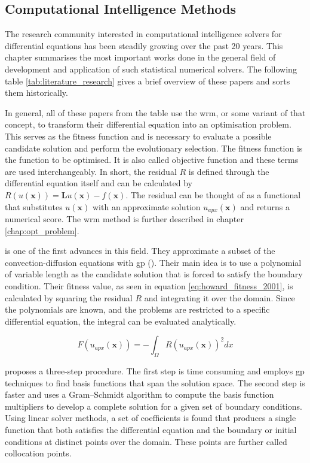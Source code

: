 \documentclass[./\jobname.tex]{subfiles}
\begin{document}
\subsection{Computational Intelligence Methods} 
\label{chap:literature_overview}

The research community interested in computational intelligence solvers for differential equations has been steadily growing over the past 20 years. This chapter summarises the most important works done in the general field of development and application of such statistical numerical solvers. The following table \ref{tab:literature_research} gives a brief overview of these papers and sorts them historically. 

In general, all of these papers from the table use the \gls{wrm}, or some variant of that concept, to transform their differential equation into an optimisation problem. This serves as the fitness function and is necessary to evaluate a possible candidate solution and perform the evolutionary selection. The fitness function is the function to be optimised. It is also called objective function and these terms are used interchangeably. In short, the residual $R$ is defined through the differential equation itself and can be calculated by $R(u(\mathbf{x})) = \mathbf{L}u(\mathbf{x}) - f(\mathbf{x})$. The residual can be thought of as a functional that substitutes $u(\mathbf{x})$ with an approximate solution $u_{apx}(\mathbf{x})$ and returns a numerical score. The \gls{wrm} method is further described in chapter \ref{chap:opt_problem}.

\cite{howard_genetic_2001} is one of the first advances in this field. They approximate a subset of the convection-diffusion equations with \gls{gp} (\cite{koza_genetic_1992}). Their main idea is to use a polynomial of variable length as the candidate solution that is forced to satisfy the boundary condition. Their fitness value, as seen in equation \eqref{eq:howard_fitness_2001}, is calculated by squaring the residual $R$ and integrating it over the domain. Since the polynomials are known, and the problems are restricted to a specific differential equation, the integral can be evaluated analytically. 

\begin{equation}
\label{eq:howard_fitness_2001}
	F(u_{apx}(\mathbf{x})) = -\int_{\Omega} R(u_{apx}(\mathbf{x}))^2 dx
\end{equation}

\cite{kirstukas_hybrid_2005} proposes a three-step procedure. The first step is time consuming and employs \gls{gp} techniques to find basis functions that span the solution space. The second step is faster and uses a Gram–Schmidt algorithm to compute the basis function multipliers to develop a complete solution for a given set of boundary conditions. Using linear solver methods, a set of coefficients is found that produces a single function that both satisfies the differential equation and the boundary or initial conditions at distinct points over the domain. These points are further called collocation points. 
\end{document}
